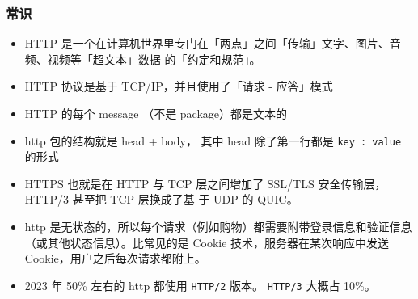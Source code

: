 
\begin{issues}
\issueDraft
\end{issues}

\subsubsection{常识}
\begin{itemize}
\item HTTP 是一个在计算机世界里专门在「两点」之间「传输」文字、图片、音频、视频等「超文本」数据 的「约定和规范」。
\item HTTP 协议是基于  TCP/IP，并且使用了「请求 - 应答」模式
\item HTTP 的每个 message （不是 package）都是文本的
\item http 包的结构就是 head + body， 其中 head 除了第一行都是 \verb`key : value` 的形式
\item HTTPS 也就是在 HTTP 与 TCP 层之间增加了 SSL/TLS 安全传输层，HTTP/3 甚至把 TCP 层换成了基 于 UDP 的 QUIC。
\item http 是无状态的，所以每个请求（例如购物）都需要附带登录信息和验证信息（或其他状态信息）。比常见的是 Cookie 技术，服务器在某次响应中发送 Cookie，用户之后每次请求都附上。
\item 2023 年 50\% 左右的 http 都使用 \verb`HTTP/2` 版本。 \verb`HTTP/3` 大概占 10\%。
\end{itemize}

